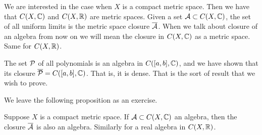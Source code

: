 We are interested in the case when
$X$ is a compact metric space.  Then
we have that $C(X,{\mathbb{C}})$ and $C(X,{\mathbb{R}})$ are metric spaces.
Given a set ${\mathcal{A}} \subset C(X,{\mathbb{C}})$, the set of all uniform
limits is the metric space closure $\overline{{\mathcal{A}}}$.
When we talk about closure of an algebra
from now on we will mean the closure in $C(X,{\mathbb{C}})$
as a metric space.  Same for $C(X,{\mathbb{R}})$.

The set ${\mathcal{P}}$ of all polynomials is an algebra in
$C([a,b],{\mathbb{C}})$, and we
have shown that its closure $\overline{{\mathcal{P}}} = C([a,b],{\mathbb{C}})$.
That is, it is dense.  That is the sort of result that we wish to prove.

We leave the following proposition as an exercise.

\begin{prop} \label{prop:closureofalgebra}
Suppose $X$ is a compact metric space.
If ${\mathcal{A}} \subset C(X,{\mathbb{C}})$ an algebra, then the closure $\overline{{\mathcal{A}}}$ is also an algebra.
Similarly for a real algebra in $C(X,{\mathbb{R}})$.
\end{prop}


